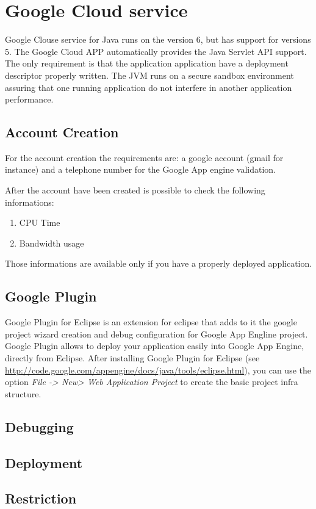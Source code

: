 \documentclass{article}
\begin{document}
\section{Google Cloud service}

Google Clouse service for Java runs on the version 6, but has support for versions 5. 
The Google Cloud APP automatically provides the Java Servlet API support. The only requirement is that the application application have a deployment descriptor properly written. 
The JVM runs on a secure sandbox environment assuring that one running application do not interfere in another application performance.

\subsection{Account Creation}

For the account creation the requirements are: a google account (gmail for instance) and a telephone number for the Google App engine validation.

After the account have been created is possible to check the following informations:
\begin{enumerate}
\item CPU Time
\item Bandwidth usage
\end{enumerate}

Those informations are available only if you have a properly deployed application.

\subsection{Google Plugin}

Google Plugin for Eclipse is an extension for eclipse that adds to it the google project wizard creation and debug configuration for Google App Engline project.
Google Plugin allows to deploy your application easily into Google App Engine, directly from Eclipse.
After installing Google Plugin for Eclipse (see \url{http://code.google.com/appengine/docs/java/tools/eclipse.html}), you can use the option \emph{File -> New> Web Application Project} to create the basic project infra structure.

\subsection{Debugging}
\subsection{Deployment}
\subsection{Restriction}
\end{document}
